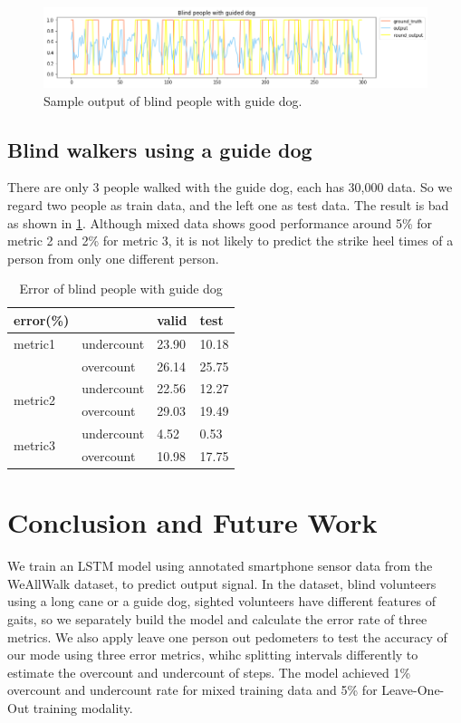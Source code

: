 \documentclass[11pt]{article}
\begin{document}
{\begin{figure}[ht]
\centering
\includegraphics[scale=0.5]{blind_gd}
\caption{Sample output of blind people with guide dog.}
\label{fig:blind_gd}
\end{figure}


\subsection{Blind walkers using a guide dog}

There are only 3 people walked with the guide dog, each has 30,000 data. So we regard two people as train data, and the left one as test data. The result is bad as shown in \ref{fig:blind_gd}. Although mixed data shows good performance around 5\% for metric 2 and 2\% for metric 3, it is not likely to predict the strike heel times of a person from only one different person.

\begin{table}[]
\centering
\caption{Error of blind people with guide dog}
\label{my-label}
\begin{tabular}{llll}
\hline
error(\%)                &            & valid & test  \\ \hline
metric1                  & undercount & 23.90 & 10.18 \\
                         & overcount  & 26.14 & 25.75 \\ \hline
\multirow{2}{*}{metric2} & undercount & 22.56 & 12.27 \\
                         & overcount  & 29.03 & 19.49 \\ \hline
\multirow{2}{*}{metric3} & undercount & 4.52  & 0.53  \\
                         & overcount  & 10.98 & 17.75 \\ \hline
\end{tabular}
\end{table}


\section{Conclusion and Future Work}

We train an LSTM model using annotated smartphone sensor data from the WeAllWalk dataset, to predict output signal. In the dataset, blind volunteers using a long cane or a guide dog, sighted volunteers have different features of gaits, so we separately build the model and calculate the error rate of three metrics. We also apply leave one person out pedometers to test the accuracy of our mode using three error metrics, whihc splitting intervals differently to estimate the overcount and undercount of steps.  The model achieved 1\% overcount and undercount rate for mixed training data and 5\% for Leave-One-Out training modality.

}
\end{document}
